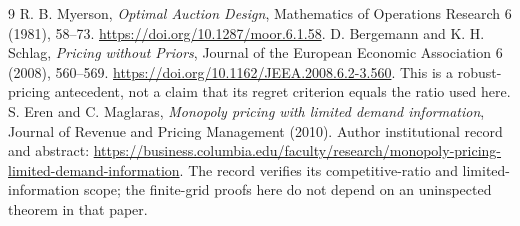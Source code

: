 \documentclass[11pt]{article}
\theoremstyle{remark}\newtheorem{remark}[theorem]{Remark}
\begin{document}
\begin{thebibliography}{9}
 R. B. Myerson, \emph{Optimal Auction Design}, Mathematics of Operations Research 6 (1981), 58--73. \url{https://doi.org/10.1287/moor.6.1.58}.
 D. Bergemann and K. H. Schlag, \emph{Pricing without Priors}, Journal of the European Economic Association 6 (2008), 560--569. \url{https://doi.org/10.1162/JEEA.2008.6.2-3.560}. This is a robust-pricing antecedent, not a claim that its regret criterion equals the ratio used here.
 S. Eren and C. Maglaras, \emph{Monopoly pricing with limited demand information}, Journal of Revenue and Pricing Management (2010). Author institutional record and abstract: \url{https://business.columbia.edu/faculty/research/monopoly-pricing-limited-demand-information}. The record verifies its competitive-ratio and limited-information scope; the finite-grid proofs here do not depend on an uninspected theorem in that paper.
\end{thebibliography}
\end{document}
